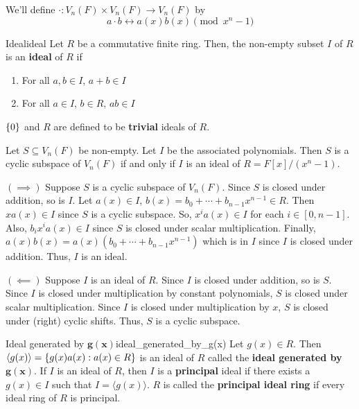 We'll define $ \cdot : V_n(F)\times V_n(F)\to V_n(F) $
by
\[ a\cdot b \longleftrightarrow a(x)b(x)\pmod{x^n-1} \]

\begin{Definition}{Ideal}{ideal}
    Let $ R $ be a commutative finite ring. Then, the non-empty
    subset $ I $ of $ R $ is an \textbf{ideal} of $ R $ if
    \begin{enumerate}[label=(\arabic*)]
        \item For all $ a,b\in I $, $ a+b\in I $
        \item For all $ a\in I $, $ b\in R $, $ ab\in I $
    \end{enumerate}
    $ \{0\} $ and $ R $ are defined to be \textbf{trivial} ideals of $ R $.
\end{Definition}

\begin{Theorem}{}{}
    Let $ S\subseteq V_n(F) $ be non-empty. Let $ I $ be the associated polynomials.
    Then $ S $ is a cyclic subspace of $ V_n(F) $ if and only if $ I $
    is an ideal of $ R=F[x]/(x^n-1) $.
\end{Theorem}

\begin{Proof}{}{}
    $ (\implies) $ Suppose $ S $ is a cyclic subspace of $ V_n(F) $.
    Since $ S $ is closed under addition, so is $ I $.
    Let $ a(x)\in I $, $ b(x)=b_0+\cdots+b_{n-1}x^{n-1}\in R $.
    Then $ xa(x)\in I $ since $ S $ is a cyclic subspace. So,
    $ x^i a(x)\in I $ for each $ i\in [0,n-1] $. Also,
    $ b_i x^i a(x)\in I $ since $ S $ is closed under scalar multiplication.
    Finally, $ a(x)b(x)=a(x)(b_0+\cdots+b_{n-1}x^{n-1}) $ which is in $ I $
    since $ I $ is closed under addition. Thus, $ I $ is an ideal.

    $ (\impliedby) $ Suppose $ I $ is an ideal of $ R $. Since $ I $
    is closed under addition, so is $ S $. Since $ I $ is closed
    under multiplication by constant polynomials, $ S $ is closed
    under scalar multiplication. Since $ I $ is closed under
    multiplication by $ x $, $ S $ is closed under (right) cyclic shifts.
    Thus, $ S $ is a cyclic subspace.
\end{Proof}

\begin{Definition}{Ideal generated by $\symbf{g(x)}$}{ideal_generated_by_g(x)}
    Let $ g(x)\in R $. Then $ \langle g(x) \rangle = \{g(x)a(x):a(x)\in R\} $
    is an ideal of $ R $ called the \textbf{ideal generated by $\symbf{g(x)}$}.
    If $ I $ is an ideal of $ R $, then $ I $ is a \textbf{principal}
    ideal if there exists a $ g(x)\in I $ such that $ I= \langle g(x) \rangle $.
    $ R $ is called the \textbf{principal ideal ring} if every ideal
    ring of $ R $ is principal.
\end{Definition}

